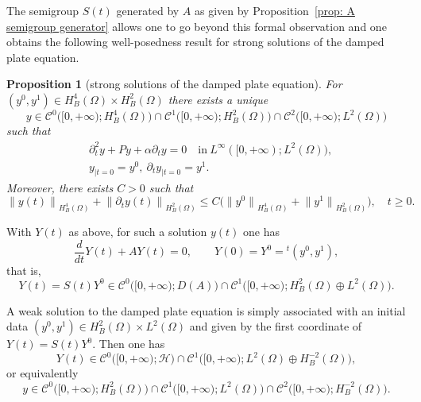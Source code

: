 \documentclass[JEP,XML,SOM,Unicode,published]{cedram}
\theoremstyle{plain}
\newtheorem{proposition}[theorem]{Proposition}
\theoremstyle{definition}
\renewcommand{\H}{{\mathcal H}}
\newcommand{\transp}{\ensuremath{\phantom{}^{t}}}
\newcommand{\Norm}[2]{{\| #1 \|}_{#2}}
\newcommand{\Con}{\ensuremath{\mathscr C}}
\begin{document}
The semigroup $S(t)$ generated by $A$ as given by
Proposition~\ref{prop: A semigroup generator} allows one to go beyond
this formal observation and one obtains the
following well-posedness result for strong solutions of the damped
plate equation.

\skpt
\begin{proposition}[strong solutions of the damped plate equation]
\label{prop: strong solutions plate equation}
For $(y^0, y^1) \in H^4_B(\Omega)\times H^2_B(\Omega)$ there exists a unique
\begin{equation*}
y \in \Con^0 \big([0,+\infty); H^4_B(\Omega)\big)
\cap \Con^1 \big([0,+\infty); H^2_B(\Omega) \big) \cap
\Con^2\big([0,+\infty); L^2(\Omega)\big)
\end{equation*}
such that
\begin{equation}
\label{eq: damped plate equation-strong solution}
\begin{split}
&\partial_t^2 y + P y + \alpha \partial_t y =0 \quad \text{in} \
L^\infty([0,+\infty); L^2(\Omega)), \\
&y_{|t=0} = y^0, \ \partial_t y_{|t=0} = y^1.
\end{split}
\end{equation}
Moreover, there exists $C>0$ such that
\begin{equation}
\label{eq: continuity strong solution damped plate equation-LS}
\Norm{y (t)}{H^4_B(\Omega)} + \Norm{\partial_t y (t)}{H^2_B(\Omega)}
\leq C \big(\Norm{y^0}{H^4_B(\Omega)} +
\Norm{y^1}{H^2_B(\Omega)}\big), \quad t\geq 0.
\end{equation}
\end{proposition}
With $Y(t)$ as above, for such a solution $y(t)$ one has
\begin{equation*}
\frac{d}{d t} Y(t) + A Y(t) =0, \qquad Y(0) = Y^0 = \transp(y^0,y^1),
\end{equation*}
that is,
\begin{equation*}
Y(t) = S(t) Y^0\in
\Con^0 \big([0,+\infty); D(A) \big)
\cap \Con^1 \big([0,+\infty); H^2_B(\Omega) \oplus L^2(\Omega) \big).
\end{equation*}

A weak solution to the damped plate equation is simply associated with
an initial data $(y^0, y^1) \in H^2_B(\Omega) \times L^2(\Omega)$ and
given by the first coordinate of $Y(t) = S(t) Y^0$. Then one has
\begin{equation*}
Y(t) \in
\Con^0 \big([0,+\infty); \H \big)
\cap \Con^1 \big([0,+\infty); L^2(\Omega) \oplus H^{-2}_B(\Omega) \big),
\end{equation*}
or equivalently
\begin{equation*}
y \in \Con^0 \big([0,+\infty); H^2_B(\Omega)\big)
\cap \Con^1 \big([0,+\infty); L^2(\Omega) \big)
\cap\Con^2\big([0,+\infty); H^{-2}_B(\Omega)\big) .
\end{equation*}
\end{document}
